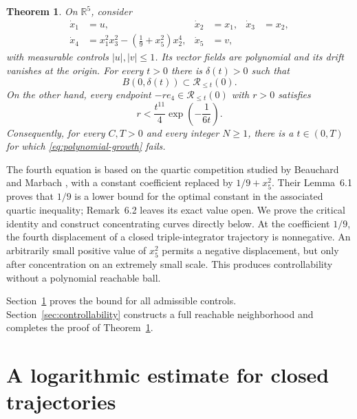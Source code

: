 \documentclass[11pt,a4paper]{article}
\newtheorem{theorem}{Theorem}
\newcommand{\R}{\mathbb{R}}
\newcommand{\Reach}{\mathcal{R}}
\begin{document}
\begin{theorem}\label{thm:counterexample}
On $\R^5$, consider
\begin{equation}\label{eq:system}
\begin{aligned}
 \dot x_1&=u, & \dot x_2&=x_1, & \dot x_3&=x_2,\\
 \dot x_4&=x_1^2x_3^2-\left(\frac19+x_5^2\right)x_2^4,
 &\dot x_5&=v,
\end{aligned}
\end{equation}
with measurable controls $|u|,|v|\le1$. Its vector fields are polynomial and
its drift vanishes at the origin. For every $t>0$ there is $\delta(t)>0$ such
that
\begin{equation}\label{eq:qualitative-ball}
 B(0,\delta(t))\subset\Reach_{\le t}(0).
\end{equation}
On the other hand, every endpoint $-r e_4\in\Reach_{\le t}(0)$ with $r>0$
satisfies
\begin{equation}\label{eq:flat-bound}
 r<\frac{t^{11}}4\exp\left(-\frac1{6t}\right).
\end{equation}
Consequently, for every $C,T>0$ and every integer $N\ge1$, there is a
$t\in(0,T)$ for which \eqref{eq:polynomial-growth} fails.
\end{theorem}

The fourth equation is based on the quartic competition studied by
Beauchard and Marbach \cite[Section~6]{BeauchardMarbach}, with a constant
coefficient replaced by $1/9+x_5^2$. Their Lemma~6.1 proves that $1/9$ is a
lower bound for the optimal constant in the associated quartic inequality;
Remark~6.2 leaves its exact value open. We prove the critical identity and
construct concentrating curves directly below. At the coefficient $1/9$,
the fourth displacement of a closed triple-integrator trajectory is
nonnegative. An arbitrarily small positive value of $x_5^2$ permits a
negative displacement, but only after concentration on an extremely small
scale. This produces controllability without a polynomial reachable ball.

Section~\ref{sec:logarithmic} proves the bound for all admissible controls.
Section~\ref{sec:controllability} constructs a full reachable neighborhood
and completes the proof of Theorem~\ref{thm:counterexample}.

\section{A logarithmic estimate for closed trajectories}
\label{sec:logarithmic}
\end{document}
